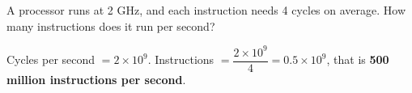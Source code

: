 \begin{tamrin}
    A processor runs at 2 GHz, and each instruction needs 4 cycles on average. How many instructions does it run per second?
\end{tamrin}
\begin{hall}
    Cycles per second $= 2 \times 10^{9}$. Instructions $= \dfrac{2 \times 10^{9}}{4} = 0.5 \times 10^{9}$,
    that is \textbf{500 million instructions per second}.
\end{hall}
